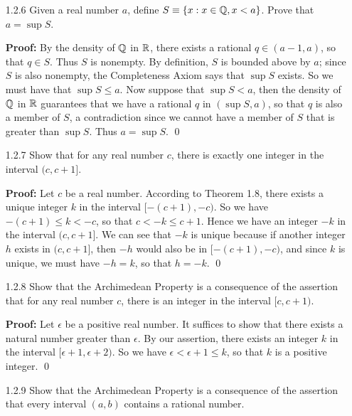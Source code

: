 \begin{enumerate}
      \textbf{Proof:} Assume by way of contradiction that $a > 0$. By The
      Archimedean Property there exists a natural number $k$ such that
      $a > 1/k$, a contradiction. Thus $a \le 0$. \qed

   \item[1.2.6]   Given a real number $a$, define
                  $S \equiv \{x : x \in \mathbb{Q}, x < a\}$. Prove that $a = \sup S$.

      \textbf{Proof:} By the density of $\mathbb{Q}$ in $\mathbb{R}$, there exists a rational
      $q \in (a - 1, a)$, so that $q \in S$. Thus $S$ is nonempty. By 
      definition, $S$ is bounded above by $a$; since $S$ is also nonempty, the
      Completeness Axiom says that $\sup S$ exists. So we must have that
      $\sup S \le a$. Now suppose that $\sup S < a$, then the density of $\mathbb{Q}$ in
      $\mathbb{R}$ guarantees that we have a rational $q$ in $(\sup S, a)$, so that $q$
      is also a member of $S$, a contradiction since we cannot have a member of
      $S$ that is greater than $\sup S$. Thus $a = \sup S$. \qed

   \item[1.2.7]   Show that for any real number $c$, there is exactly one 
                  integer in the interval $(c, c+1]$.

      \textbf{Proof:} Let $c$ be a real number. According to Theorem 1.8, there
      exists a unique integer $k$ in the interval $[-(c + 1), -c)$. So we have
      $-(c + 1) \le k < -c$, so that $c < -k \le c + 1$. Hence we have an
      integer $-k$ in the interval $(c, c + 1]$. We can see that $-k$ is unique
      because if another integer $h$ exists in $(c, c + 1]$, then $-h$ would
      also be in $[-(c + 1), -c)$, and since $k$ is unique, we must have
      $-h = k$, so that $h = -k$. \qed
   
   \item[1.2.8]   Show that the Archimedean Property is a consequence of the
                  assertion that for any real number $c$, there is an integer in
                  the interval $[c, c + 1)$.

      \textbf{Proof:} Let $\epsilon$ be a positive real number. It suffices to
      show that there exists a natural number greater than $\epsilon$. By our
      assertion, there exists an integer $k$ in the interval
      $[\epsilon+ 1, \epsilon + 2)$. So we have $\epsilon < \epsilon + 1 \le k$,
      so that $k$ is a positive integer. \qed
   \item[1.2.9]   Show that the Archimedean Property is a consequence of the
                  assertion that every interval $(a, b)$ contains a rational
                  number.


\end{enumerate}

